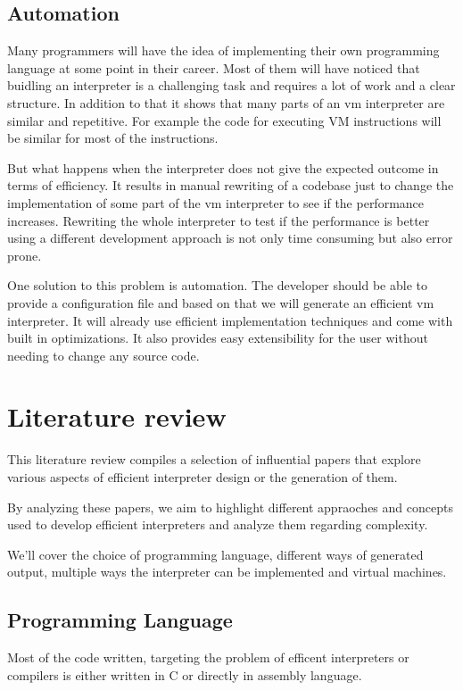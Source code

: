 \documentclass{article}
\begin{document}
\subsection{Automation}
Many programmers will have the idea of implementing their own programming
language at some point in their career. Most of them will have noticed that
buidling an interpreter is a challenging task and requires a lot of work and
a clear structure. In addition to that it shows that many parts of an vm
interpreter are similar and repetitive. For example the code for executing 
VM instructions will be similar for most of the instructions. ~\cite{vmgen}

But what happens when the interpreter does not give the expected outcome in
terms of efficiency. It results in manual rewriting of a codebase just to
change the implementation of some part of the vm interpreter to see if the
performance increases. Rewriting the whole interpreter to test if the
performance is better using a different development approach is not only time
consuming but also error prone.

One solution to this problem is automation. The developer should be able to
provide a configuration file and based on that we will generate an efficient vm
interpreter. It will already use efficient implementation techniques and come
with built in optimizations. It also provides easy extensibility for the user
without needing to change any source code.

\section{Literature review}
This literature review compiles a selection of influential papers that explore
various aspects of efficient interpreter design or the generation of them. 

By analyzing these papers, we aim to highlight different appraoches and
concepts used to develop efficient interpreters and analyze them regarding
complexity.

We'll cover the choice of programming language, different ways of generated
output, multiple ways the interpreter can be implemented and virtual machines.

\subsection{Programming Language}
Most of the code written, targeting the problem of efficent interpreters or
compilers is either written in C or directly in assembly language.
\end{document}
